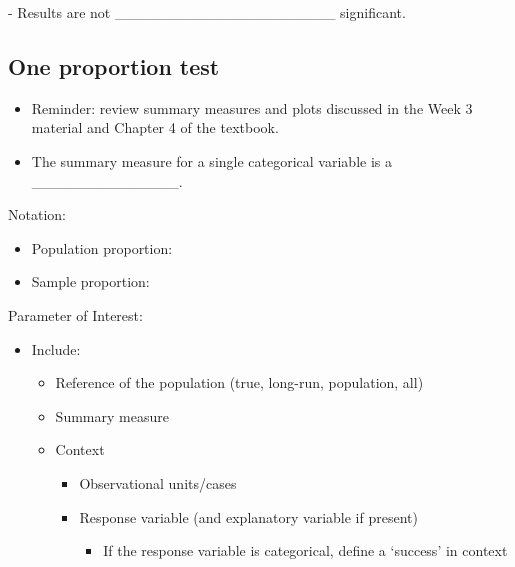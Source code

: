 \documentclass[
]{report}
\providecommand{\tightlist}{%
  \setlength{\itemsep}{0pt}\setlength{\parskip}{0pt}}
\newcommand{\rgi}{\hspace{24pt}}  %
\begin{document}
\rgi \rgi \rgi - Results are not \_\_\_\_\_\_\_\_\_\_\_\_\_\_\_\_\_\_\_\_\_ significant.

\hypertarget{one-proportion-test}{%
\subsection*{One proportion test}\label{one-proportion-test}}

\begin{itemize}
\item
  Reminder: review summary measures and plots discussed in the Week 3 material and Chapter 4 of the textbook.
\item
  The summary measure for a single categorical variable is a \_\_\_\_\_\_\_\_\_\_\_\_\_\_.
\end{itemize}

Notation:

\begin{itemize}
\item
  Population proportion:
\item
  Sample proportion:
\end{itemize}

\newpage

Parameter of Interest:

\begin{itemize}
\item
  Include:

  \begin{itemize}
  \item
    Reference of the population (true, long-run, population, all)
  \item
    Summary measure
  \item
    Context

    \begin{itemize}
    \item
      Observational units/cases
    \item
      Response variable (and explanatory variable if present)

      \begin{itemize}
      \tightlist
      \item
        If the response variable is categorical, define a `success' in context
      \end{itemize}
    \end{itemize}
  \end{itemize}
\end{itemize}
\end{document}
